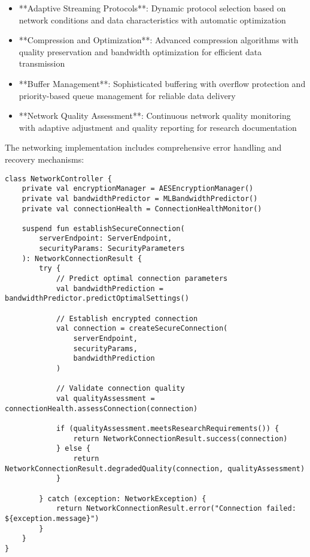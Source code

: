 \documentclass[12pt,a4paper]{report}
\begin{document}
\begin{itemize}
\item **Adaptive Streaming Protocols**: Dynamic protocol selection based on network conditions and data characteristics with
  automatic optimization
\item **Compression and Optimization**: Advanced compression algorithms with quality preservation and bandwidth optimization
  for efficient data transmission
\item **Buffer Management**: Sophisticated buffering with overflow protection and priority-based queue management for
  reliable data delivery
\item **Network Quality Assessment**: Continuous network quality monitoring with adaptive adjustment and quality reporting
  for research documentation

\end{itemize}
The networking implementation includes comprehensive error handling and recovery mechanisms:

\begin{verbatim}
class NetworkController {
    private val encryptionManager = AESEncryptionManager()
    private val bandwidthPredictor = MLBandwidthPredictor()
    private val connectionHealth = ConnectionHealthMonitor()

    suspend fun establishSecureConnection(
        serverEndpoint: ServerEndpoint,
        securityParams: SecurityParameters
    ): NetworkConnectionResult {
        try {
            // Predict optimal connection parameters
            val bandwidthPrediction = bandwidthPredictor.predictOptimalSettings()

            // Establish encrypted connection
            val connection = createSecureConnection(
                serverEndpoint,
                securityParams,
                bandwidthPrediction
            )

            // Validate connection quality
            val qualityAssessment = connectionHealth.assessConnection(connection)

            if (qualityAssessment.meetsResearchRequirements()) {
                return NetworkConnectionResult.success(connection)
            } else {
                return NetworkConnectionResult.degradedQuality(connection, qualityAssessment)
            }

        } catch (exception: NetworkException) {
            return NetworkConnectionResult.error("Connection failed: ${exception.message}")
        }
    }
}
\end{verbatim}
\end{document}
